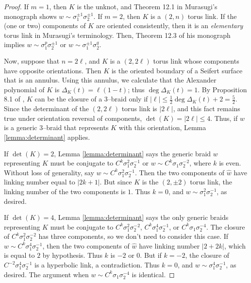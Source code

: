 \documentclass[11pt]{amsart}
\newcommand{\abs}[1]{{\left\vert #1 \right\vert}}
\theoremstyle{plain}
\theoremstyle{definition}
\begin{document}
\begin{proof}
If $m=1$, then $K$ is the unknot, and Theorem 12.1 in Murasugi's
monograph shows $w \sim \sigma_1^{\pm 1} \sigma_2^{\pm 1}$.  If $m=2$,
then $K$ is a $(2,n)$ torus link.  If the (one or two) components of $K$ are 
oriented consistently, then it is an \emph{elementary}
torus link in Murasugi's terminology.  Then, Theorem 12.3 of his
monograph implies $w \sim \sigma_1^p \sigma_2^{\pm 1}$ or $w\sim
\sigma_1^{\pm 1} \sigma_2^{q}$.

Now, suppose that $n=2\ell$, and $K$ is a $(2, 2\ell)$ torus link whose
components have opposite orientations.  Then $K$ is the oriented
boundary of a Seifert surface that is an annulus.  Using this annulus,
we calculate that the Alexander polynomial of $K$ is $\Delta_K(t)=
\ell(1-t)$; thus $\deg{\Delta_K(t)}=1$.  By Proposition 8.1 of
\cite{murasugi:3braids}, $K$ can be the closure of a 3--braid only if
$\abs{\ell} \leq \frac{1}{2}{\deg \Delta_K(t)}+2=\frac{5}{2}$.  Since the
determinant of the $(2, 2\ell)$ torus link is $\abs {2\ell}$, and this fact
remains true under orientation reversal of components, $\det(K) =
\abs{2\ell} \leq 4$.  Thus, if $w$ is a generic $3$--braid that
represents $K$ with this orientation, Lemma \ref{lemma:determinant}
applies.

If $\det(K)= 2$, Lemma \ref{lemma:determinant} says the generic braid
$w$ representing $K$ must be conjugate to $C^k \sigma_1^2
\sigma_2^{-1}$ or $w \sim C^k \sigma_1 \sigma_2^{-2}$, where $k$ is even.  
Without loss
of generality, say $w \sim C^k \sigma_1^2 \sigma_2^{-1}$.  Then the
two components of $\hat{w}$ have linking number equal to $\abs{2k+1}$.
But since $K$ is the $(2, \pm2)$ torus link, the linking number of the
two components is $1$.  Thus $k=0$, and $w \sim \sigma_1^2
\sigma_2^{-1}$, as desired.

If $\det(K)= 4$, Lemma \ref{lemma:determinant} says the only generic
braids representing $K$ must be conjugate to $C^k \sigma_1^2
\sigma_2^{-2}$, $C^k \sigma_1^4 \sigma_2^{-1}$, or $C^k \sigma_1
\sigma_2^{-4}$.  The closure of $C^k \sigma_1^2 \sigma_2^{-2}$ has
three components, so we don't need to consider this case.  If $w \sim
C^k \sigma_1^{4} \sigma_2^{-1}$, then the two components of $\hat{w}$
have linking number $\abs{2+2k}$, which is equal to $2$ by hypothesis.
Thus $k$ is $-2$ or $0$.  But if $k = -2$, the closure of $C^{-2}
\sigma_1^4 \sigma_2^{-1}$ is a hyperbolic link, a contradiction.  Thus
$k=0$, and $w \sim \sigma_1^4 \sigma_2^{-1}$, as desired.  The
argument when $w \sim C^k \sigma_1 \sigma_2^{-4}$ is identical.


\end{proof}
\end{document}
